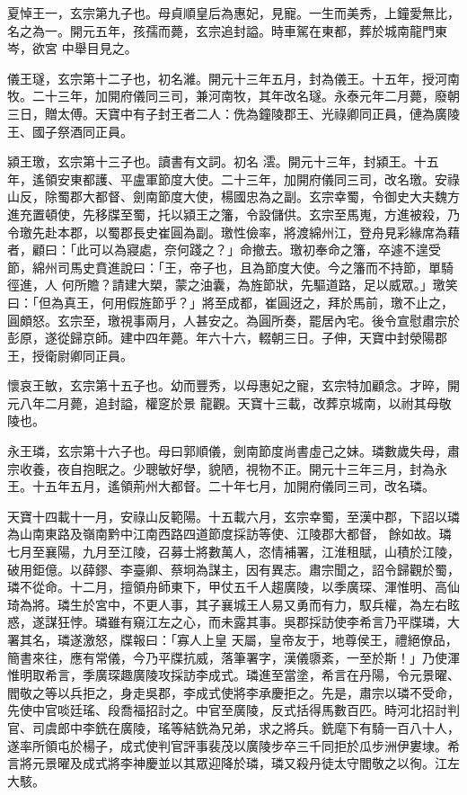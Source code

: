 \begin{pinyinscope}
 夏悼王一，玄宗第九子也。母貞順皇后為惠妃，見寵。一生而美秀，上鐘愛無比，名之為一。開元五年，孩孺而薨，玄宗追封謚。時車駕在東都，葬於城南龍門東岑，欲宮
 中舉目見之。



 儀王璲，玄宗第十二子也，初名濰。開元十三年五月，封為儀王。十五年，授河南牧。二十三年，加開府儀同三司，兼河南牧，其年改名璲。永泰元年二月薨，廢朝三日，贈太傅。天寶中有子封王者二人：侁為鐘陵郡王、光祿卿同正員，僆為廣陵王、國子祭酒同正員。



 潁王璬，玄宗第十三子也。讀書有文詞。初名
 澐。開元十三年，封潁王。十五年，遙領安東都護、平盧軍節度大使。二十三年，加開府儀同三司，改名璬。安祿山反，除蜀郡大都督、劍南節度大使，楊國忠為之副。玄宗幸蜀，令御史大夫魏方進充置頓使，先移牒至蜀，托以潁王之籓，令設儲供。玄宗至馬嵬，方進被殺，乃令璬先赴本郡，以蜀郡長史崔圓為副。璬性儉率，將渡綿州江，登舟見彩緣席為藉者，顧曰：「此可以為寢處，奈何踐之？」命撤去。璬初奉命之籓，卒遽不遑受節，綿州司馬史賁進說曰：「王，帝子也，且為節度大使。今之籓而不持節，單騎徑進，人
 何所贍？請建大槊，蒙之油囊，為旌節狀，先驅道路，足以威眾。」璬笑曰：「但為真王，何用假旌節乎？」將至成都，崔圓迓之，拜於馬前，璬不止之，圓頗怒。玄宗至，璬視事兩月，人甚安之。為圓所奏，罷居內宅。後令宣慰肅宗於彭原，遂從歸京師。建中四年薨。年六十六，輟朝三日。子伸，天寶中封滎陽郡王，授衛尉卿同正員。



 懷哀王敏，玄宗第十五子也。幼而豐秀，以母惠妃之寵，玄宗特加顧念。才晬，開元八年二月薨，追封謚，權窆於景
 龍觀。天寶十三載，改葬京城南，以祔其母敬陵也。



 永王璘，玄宗第十六子也。母曰郭順儀，劍南節度尚書虛己之妹。璘數歲失母，肅宗收養，夜自抱眠之。少聰敏好學，貌陋，視物不正。開元十三年三月，封為永王。十五年五月，遙領荊州大都督。二十年七月，加開府儀同三司，改名璘。



 天寶十四載十一月，安祿山反範陽。十五載六月，玄宗幸蜀，至漢中郡，下詔以璘為山南東路及嶺南黔中江南西路四道節度採訪等使、江陵郡大都督，
 餘如故。璘七月至襄陽，九月至江陵，召募士將數萬人，恣情補署，江淮租賦，山積於江陵，破用鉅億。以薛鏐、李臺卿、蔡坰為謀主，因有異志。肅宗聞之，詔令歸觀於蜀，璘不從命。十二月，擅領舟師東下，甲仗五千人趨廣陵，以季廣琛、渾惟明、高仙琦為將。璘生於宮中，不更人事，其子襄城王人易又勇而有力，馭兵權，為左右眩惑，遂謀狂悖。璘雖有窺江左之心，而未露其事。吳郡採訪使李希言乃平牒璘，大署其名，璘遂激怒，牒報曰：「寡人上皇
 天屬，皇帝友于，地尊侯王，禮絕僚品，簡書來往，應有常儀，今乃平牒抗威，落筆署字，漢儀隳紊，一至於斯！」乃使渾惟明取希言，季廣琛趣廣陵攻採訪李成式。璘進至當塗，希言在丹陽，令元景曜、閻敬之等以兵拒之，身走吳郡，李成式使將李承慶拒之。先是，肅宗以璘不受命，先使中官啖廷瑤、段喬福招討之。中官至廣陵，反式括得馬數百匹。時河北招討判官、司虞郎中李銑在廣陵，瑤等結銑為兄弟，求之將兵。銑麾下有騎一百八十人，
 遂率所領屯於楊子，成式使判官評事裴茂以廣陵步卒三千同拒於瓜步洲伊婁埭。希言將元景曜及成式將李神慶並以其眾迎降於璘，璘又殺丹徒太守閻敬之以徇。江左大駭。




\end{pinyinscope}
